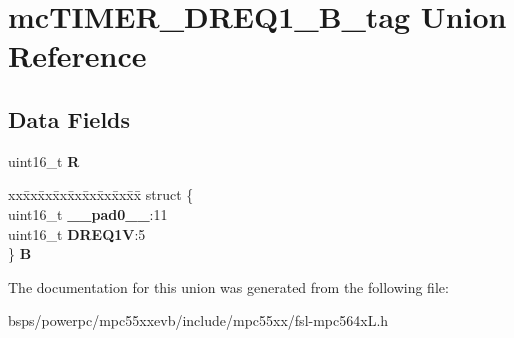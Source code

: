 \hypertarget{unionmcTIMER__DREQ1__16B__tag}{}\section{mc\+T\+I\+M\+E\+R\+\_\+\+D\+R\+E\+Q1\+\_\+B\+\_\+tag Union Reference}
\label{unionmcTIMER__DREQ1__16B__tag}
\subsection*{Data Fields}
\begin{DoxyCompactItemize}
\item 
\mbox{\label{unionmcTIMER__DREQ1__16B__tag_ab17eddee945731d772c683a747680479}} 
uint16\+\_\+t {\bfseries R}
\item 
\mbox{\label{unionmcTIMER__DREQ1__16B__tag_a97d5bf491643d8e60b88e7fa9c74f3ae}} 
\begin{tabbing}
xx\=xx\=xx\=xx\=xx\=xx\=xx\=xx\=xx\=\kill
struct \{\\
\>uint16\_t {\bfseries \_\_pad0\_\_}:11\\
\>uint16\_t {\bfseries DREQ1V}:5\\
\} {\bfseries B}\\

\end{tabbing}\end{DoxyCompactItemize}


The documentation for this union was generated from the following file\+:\begin{DoxyCompactItemize}
\item 
bsps/powerpc/mpc55xxevb/include/mpc55xx/fsl-\/mpc564x\+L.\+h\end{DoxyCompactItemize}
